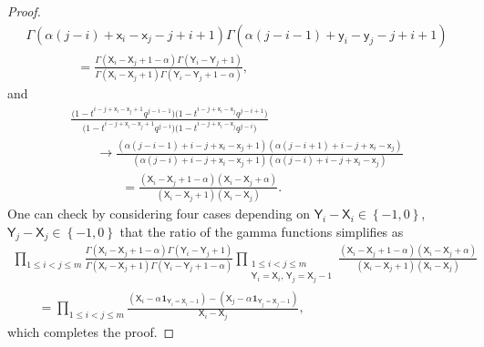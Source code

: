 \documentclass[pdftex]{sigma}
\numberwithin{equation}{section}
\begin{document}
\begin{proof}
\begin{gather*}
{		}
		{
			\Gamma(\alpha(j-i)+\mathsf{x}_i-\mathsf{x}_j-j+i+1)
			\Gamma(\alpha(j-i-1)+\mathsf{y}_i-\mathsf{y}_j-j+i+1)
		}
		\\
\qquad\qquad{}
		=
		\frac
		{
			\Gamma(\mathsf{X}_i-\mathsf{X}_j+1-\alpha)
			\Gamma(\mathsf{Y}_i-\mathsf{Y}_j+1)
		}
		{
			\Gamma(\mathsf{X}_i-\mathsf{X}_j+1)
			\Gamma(\mathsf{Y}_i-\mathsf{Y}_j+1-\alpha)
		},
	\end{gather*}
	and
	\begin{gather*}
		\frac{\big(1-t^{i-j+\mathsf{x}_{i}-\mathsf{x}_{j}+1}
		q^{j-i-1}\big)
		\big(1-t^{i-j+\mathsf{x}_{i}-\mathsf{x}_{j}} q^{j-i+1}\big)}
		{\big(1-t^{i-j+\mathsf{x}_{i}-\mathsf{x}_{j}+1} q^{j-i}\big)
		\big(1-t^{i-j+\mathsf{x}_{i}-\mathsf{x}_{j}} q^{j-i}\big)}
		\\
\qquad{}
		\to
		\frac{(\alpha(j-i-1)+i-j+\mathsf{x}_{i}-\mathsf{x}_{j}+1)
		(\alpha(j-i+1)+i-j+\mathsf{x}_{i}-\mathsf{x}_{j})}
		{(\alpha(j-i)+i-j+\mathsf{x}_{i}-\mathsf{x}_{j}+1)
		(\alpha(j-i)+ i-j+\mathsf{x}_{i}-\mathsf{x}_{j})}
		\\
\qquad\qquad{}=
		\frac{
			(\mathsf{X}_i-\mathsf{X}_j+1-\alpha)
			(\mathsf{X}_i-\mathsf{X}_j+\alpha)
		}
		{
			(\mathsf{X}_i-\mathsf{X}_j+1)
			(\mathsf{X}_i-\mathsf{X}_j)
		}.
	\end{gather*}
	One can check by considering four cases
	depending on
	$\mathsf{Y}_i-\mathsf{X}_i\in \left\{ -1,0 \right\}$,
	$\mathsf{Y}_j-\mathsf{X}_j\in \left\{ -1,0 \right\}$
	that the ratio of the gamma functions simplifies as
	\begin{gather*}
		\prod_{1\le i<j\le m}
		\frac
		{
			\Gamma(\mathsf{X}_i-\mathsf{X}_j+1-\alpha)
			\Gamma(\mathsf{Y}_i-\mathsf{Y}_j+1)
		}
		{
			\Gamma(\mathsf{X}_i-\mathsf{X}_j+1)
			\Gamma(\mathsf{Y}_i-\mathsf{Y}_j+1-\alpha)
		}
		\prod_{\substack{1\le i<j\le m
		\\
		\mathsf{Y}_{i}=\mathsf{X}_{i}
		,\,
		\mathsf{Y}_{j}=\mathsf{X}_{j}-1}}
		\frac{
			(\mathsf{X}_i-\mathsf{X}_j+1-\alpha)
			(\mathsf{X}_i-\mathsf{X}_j+\alpha)
		}
		{
			(\mathsf{X}_i-\mathsf{X}_j+1)
			(\mathsf{X}_i-\mathsf{X}_j)
		}
		\\
\qquad{} =
		\prod_{1\le i<j\le m}
		\frac{(\mathsf{X}_i - \alpha \hspace{1pt} \mathbf{1}_{\mathsf{Y}_i=\mathsf{X}_i-1})
		-(\mathsf{X}_j-\alpha \hspace{1pt} \mathbf{1}_{\mathsf{Y}_j=\mathsf{X}_j-1})}
		{\mathsf{X}_i-\mathsf{X}_j},
	\end{gather*}
	which completes the proof.
\end{proof}
\end{document}
